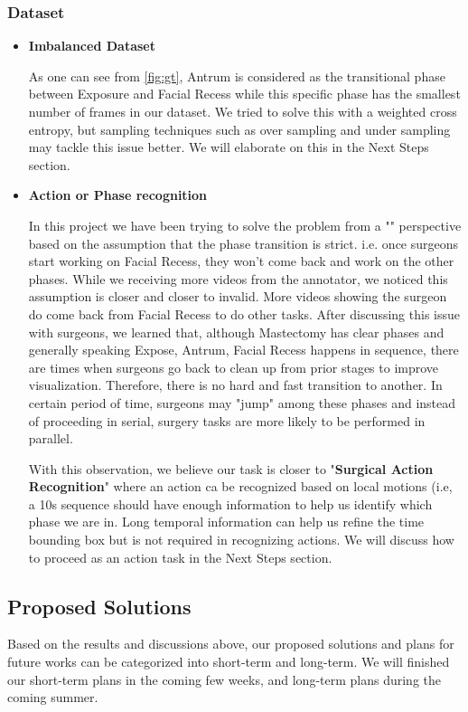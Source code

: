 \documentclass[11pt]{article} \usepackage[top=1in, bottom=1in, left=1in, right=1in]{geometry}
\begin{document}
\subsubsection{Dataset}
\begin{itemize}
    \item \textbf{Imbalanced Dataset}
    
    As one can see from \ref{fig:gt}, Antrum is considered as the transitional phase between Exposure and Facial Recess while this specific phase has the smallest number of frames in our dataset. We tried to solve this with a weighted cross entropy, but sampling techniques such as over sampling and under sampling may tackle this issue better. We will elaborate on this in the Next Steps section.  
    \item \textbf{Action or Phase recognition}
    
    In this project we have been trying to solve the problem from a "" perspective based on the assumption that the phase transition is strict. i.e. once surgeons start working on Facial Recess, they won't come back and work on the other phases. While we receiving more videos from the annotator, we noticed this assumption is closer and closer to invalid. More videos showing the surgeon do come back from Facial Recess to do other tasks. After discussing this issue with surgeons, we learned that, although Mastectomy has clear phases and generally speaking Expose, Antrum, Facial Recess happens in sequence, there are times when surgeons go back to clean up from prior stages to improve visualization. Therefore, there is no hard and fast transition to another. In certain period of time, surgeons may "jump" among these phases and instead of proceeding in serial, surgery tasks are more likely to be performed in parallel. 
    
    With this observation, we believe our task is closer to "\textbf{Surgical Action Recognition}" where an action ca be recognized based on local motions (i.e, a 10s sequence should have enough information to help us identify which phase we are in. Long temporal information can help us refine the time bounding box but is not required in recognizing actions. We will discuss how to proceed as an action task in the Next Steps section.
\end{itemize}

\subsection{Proposed Solutions}
Based on the results and discussions above, our proposed solutions and plans for future works can be categorized into short-term and long-term. We will finished our short-term plans in the coming few weeks, and long-term plans during the coming summer. 
\end{document}
